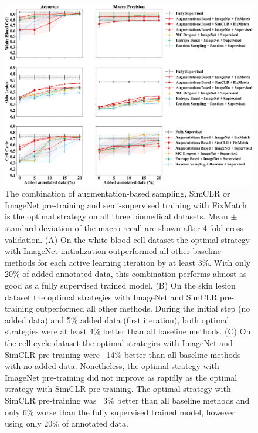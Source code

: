 \begin{figure}[htbp]
\centering
\captionsetup{format=plain}
\includegraphics[width=\textwidth]{figures/fig_3_acc_precision.png}
\caption{The combination of augmentation-based sampling, SimCLR or ImageNet pre-training and semi-supervised training with FixMatch is the optimal strategy on all three biomedical datasets. Mean $\pm$ standard deviation of the macro recall are shown after 4-fold cross-validation. (A) On the white blood cell dataset the optimal strategy with ImageNet initialization outperformed all other baseline methods for each active learning iteration by at least 3\%. With only 20\% of added annotated data, this combination performs almost as good as a fully supervised trained model. (B) On the skin lesion dataset the optimal strategies with ImageNet and SimCLR pre-training outperformed all other methods. During the initial step (no added data) and 5\% added data (first iteration), both optimal strategies were at least 4\% better than all baseline methods. (C) On the cell cycle dataset the optimal strategies with ImageNet and SimCLR pre-training were ~14\% better than all baseline methods with no added data. Nonetheless, the optimal strategy with ImageNet pre-training did not improve as rapidly as the optimal strategy with SimCLR pre-training. The optimal strategy with SimCLR pre-training was ~3\% better than all baseline methods and only 6\% worse than the fully supervised trained model, however using only 20\% of annotated data.}
\label{fig:all_acc_precision}
\end{figure}

